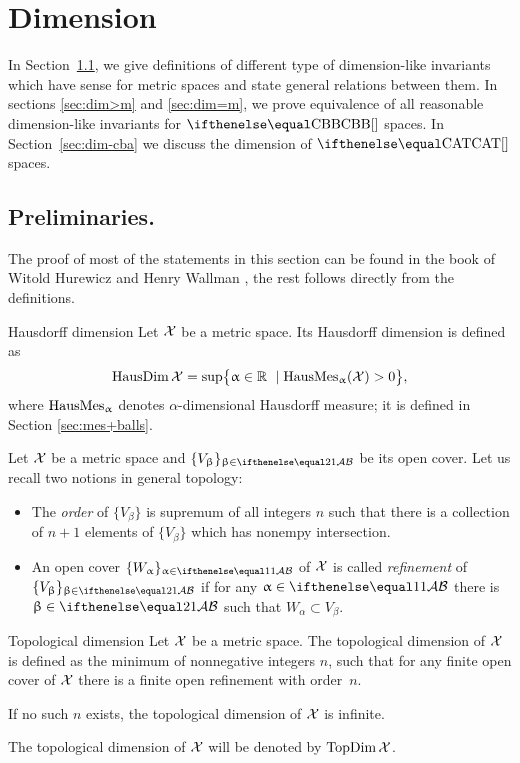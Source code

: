 \chapter{Dimension %
}

In Section~\ref{sec:prelim:dim}, we give definitions of different type of dimension-like invariants which have sense for metric spaces and state general relations between them.
In sections \ref{sec:dim>m} and \ref{sec:dim=m},
we prove equivalence of all reasonable dimension-like invariants for $\Alex{}$ spaces.
In Section~\ref{sec:dim-cba} we discuss the dimension of  $\CAT{}$ spaces.

\section{Preliminaries.}\label{sec:prelim:dim}

The proof of most of the statements in this section can be found in the book of Witold Hurewicz and Henry Wallman \cite{top-dim}, 
the rest follows directly from the definitions.

\begin{thm}{Hausdorff dimension}
\label{def:HausDim}
Let $\mathcal{X}$ be a metric space. 
Its Hausdorff dimension is defined as
\[\HausDim\spc{X}=\sup\bigl\{\alpha\in\RR\ \mid \HausMes_\alpha(\spc{X})>0\bigr\},\]
 where $\mathop{\rm HausMes}\nolimits_\upalpha$ denotes $\alpha$-dimensional Hausdorff measure;
it is defined in Section \ref{sec:mes+balls}.
\end{thm}

Let $\mathcal{X}$ be a metric space and $\{V_\beta\}_{\beta\in\IndexSet[2]}$
 be its open cover.
Let us recall two notions in general topology:
\begin{itemize}
\item The \emph{order} of $\{V_\beta\}$ is supremum of all integers $n$ such that there is a collection of $n+1$ elements of $\{V_\beta\}$ which has nonempy intersection.
\item An open cover $\{W_\alpha\}_{\alpha\in\IndexSet}$ of $\mathcal{X}$ is called \emph{refinement} of  $\{V_\beta\}_{\beta\in\IndexSet[2]}$ if for any $\alpha\in\IndexSet$ there is $\beta\in\IndexSet[2]$ such that $W_\alpha\subset V_\beta$.
\end{itemize}

\begin{thm}{Topological dimension}
\label{def:TopDim}
Let $\mathcal{X}$ be a metric space. 
The topological dimension of $\mathcal{X}$ is defined as the minimum of nonnegative integers $n$, 
such that for any finite open cover of $\mathcal{X}$ there is a finite open refinement with order~$n$.

If no such $n$ exists, the topological dimension of $\mathcal{X}$ is infinite.

The topological dimension of $\mathcal{X}$ will be denoted by $\mathop{\rm TopDim}\nolimits\mathcal{X}$.
\end{thm}

